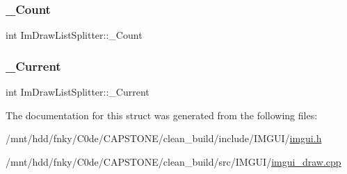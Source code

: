 \mbox{\label{structImDrawListSplitter_ae3a1593ee05bc52e6284943eab3c97a2}} 
\subsubsection{\texorpdfstring{\+\_\+\+Count}{\_Count}}
{\footnotesize\ttfamily int Im\+Draw\+List\+Splitter\+::\+\_\+\+Count}

\mbox{\label{structImDrawListSplitter_a99a46d62e09810f31d0a6efd4a0d2b09}} 
\subsubsection{\texorpdfstring{\+\_\+\+Current}{\_Current}}
{\footnotesize\ttfamily int Im\+Draw\+List\+Splitter\+::\+\_\+\+Current}



The documentation for this struct was generated from the following files\+:\begin{DoxyCompactItemize}
\item 
/mnt/hdd/fnky/\+C0de/\+C\+A\+P\+S\+T\+O\+N\+E/clean\+\_\+build/include/\+I\+M\+G\+U\+I/\hyperlink{imgui_8h}{imgui.\+h}\item 
/mnt/hdd/fnky/\+C0de/\+C\+A\+P\+S\+T\+O\+N\+E/clean\+\_\+build/src/\+I\+M\+G\+U\+I/\hyperlink{imgui__draw_8cpp}{imgui\+\_\+draw.\+cpp}\end{DoxyCompactItemize}
